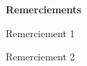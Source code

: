 \null
\vspace{4cm}
\begin{flushright}
	{\Large \bfseries Remerciements}

	\vspace{1cm}

	\begin{minipage}{0.62\textwidth}
		Remerciement 1
	\end{minipage}

	\vspace{1cm}

	\begin{minipage}{0.62\textwidth}
		Remerciement 2
	\end{minipage}

\end{flushright}